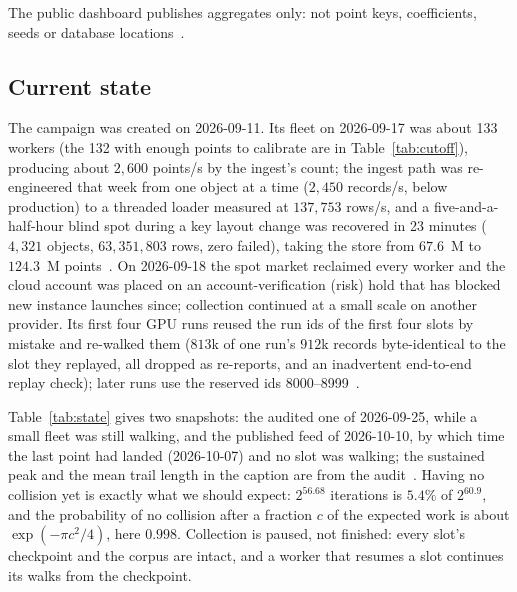 The public dashboard publishes aggregates only: not point keys,
coefficients, seeds or database locations~.

\subsection{Current state}
\label{sec:campaign-state}

The campaign was created on 2026-09-11. Its fleet on 2026-09-17 was about 133 workers (the 132 with enough
points to calibrate are in Table~\ref{tab:cutoff}), producing about
$2{,}600$ points/s by the ingest's count; the ingest path was re-engineered that week from one object
at a time ($2{,}450$ records/s, below production) to a threaded loader
measured at $137{,}753$ rows/s, and a five-and-a-half-hour blind spot during a key layout change was
recovered in 23 minutes ($4{,}321$ objects,
$63{,}351{,}803$ rows, zero failed), taking the store from $67.6$~M to
$124.3$~M points~. On 2026-09-18 the spot market reclaimed every worker and the cloud
account was placed on an account-verification (risk) hold that has
blocked new instance launches since; collection continued at a small
scale on another provider. Its first four GPU runs reused the run ids
of the first four slots by mistake and re-walked them ($813$k of one
run's $912$k records byte-identical to the slot they replayed, all
dropped as re-reports, and an inadvertent end-to-end replay check);
later runs use the reserved ids
8000--8999~.

Table~\ref{tab:state} gives two snapshots: the audited one of
2026-09-25, while a small fleet was still walking, and the published
feed of 2026-10-10, by which time the last point had landed
(2026-10-07) and no slot was walking; the sustained peak and the
mean trail length in the caption are from the
audit~.
Having no collision yet is exactly what we should expect: $2^{56.68}$ iterations is $5.4\%$
of $2^{60.9}$, and the probability of no collision after a fraction
$c$ of the expected work is about $\exp(-\pi c^2/4)$, here $0.998$.
Collection is paused, not finished: every slot's checkpoint and the
corpus are intact, and a worker that resumes a slot continues its
walks from the checkpoint.

